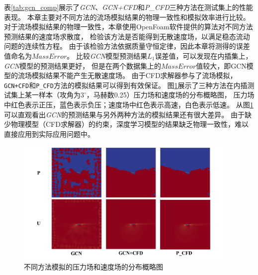 表\ref{tab:gcn_comp}展示了\textit{GCN}、\textit{GCN+CFD}和\textit{P\_CFD}三种方法在测试集上的性能表现。
本章主要对不同方法的流场模拟结果的物理一致性和模拟效率进行比较。
对于流场模拟结果的物理一致性，本章使用OpenFoam软件提供的\texttt{}算法对不同方法预测结果的速度场求散度，
检验该方法是否能得到无散速度场，以满足稳态流动问题的连续性方程。
由于该检验方法依据质量守恒定律，因此本章将测得的误差值命名为$Mass Error$。
比较\textit{GCN}模型预测结果$L_1$误差值，可以发现在内插集上，\textit{GCN}模型的预测结果更好，
但是在两个数据集上的$Mass Error$值较大，即GCN模型的流场模拟结果不能产生无散速度场。
由于CFD求解器参与了流场模拟，\texttt{GCN+CFD}和\texttt{P\_CFD}方法的模拟结果可以得到有效保证。
图\ref{fig:show}展示了三种方法在内插测试集上某一样本（攻角为$3^{\circ}$，马赫数0.25）压力场和速度场的分布概略图，
压力场中红色表示正压，蓝色表示负压；速度场中红色表示高速，白色表示低速。
从图\ref{fig:show}可以直观看出\textit{GCN}的预测结果与另外两种方法的模拟结果还有很大差异。
由于缺少物理模型（CFD求解器）的约束，深度学习模型的结果缺乏物理一致性，难以直接应用到实际应用问题中。


\begin{figure}[htp]
	\centering
	\includegraphics[width=0.96\textwidth]{figures/gcn_result/chapter4/show.png}
	\caption{不同方法模拟的压力场和速度场的分布概略图}
	\label{fig:show}
\end{figure}



